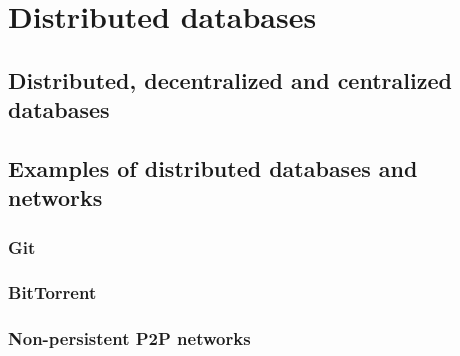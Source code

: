 \section{Distributed databases}

\iffalse
important ideas: 
- maybe add a section about database properties in general (CAP theorm) and the blockchain aspect of it (one of the papers mentions this, I think Bitfury)
\fi

\subsection{Distributed, decentralized and centralized databases}

\subsection{Examples of distributed databases and networks}

\subsubsection{Git}
\subsubsection{BitTorrent}
\subsubsection{Non-persistent P2P networks}